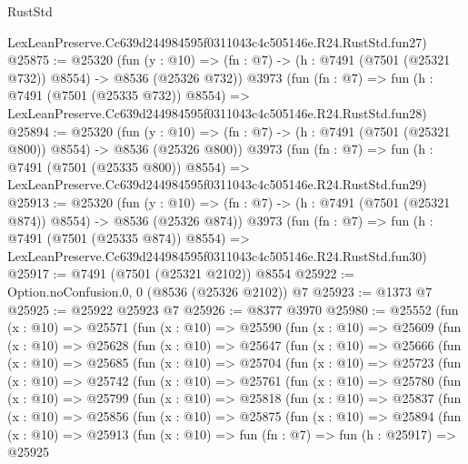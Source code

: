 \begin{lexlean}{RustStd}
\begin{coremodule}
    LexLeanPreserve.Cc639d244984595f0311043c4c505146e.R24.RustStd.fun27)
@25875 := @25320
    (fun (y : @10) => (fn : @7) -> (h : @7491 (@7501 (@25321 @732)) @8554) -> @8536 (@25326 @732))
    @3973
    (fun (fn : @7) =>
    fun (h : @7491 (@7501 (@25335 @732)) @8554) =>
    LexLeanPreserve.Cc639d244984595f0311043c4c505146e.R24.RustStd.fun28)
@25894 := @25320
    (fun (y : @10) => (fn : @7) -> (h : @7491 (@7501 (@25321 @800)) @8554) -> @8536 (@25326 @800))
    @3973
    (fun (fn : @7) =>
    fun (h : @7491 (@7501 (@25335 @800)) @8554) =>
    LexLeanPreserve.Cc639d244984595f0311043c4c505146e.R24.RustStd.fun29)
@25913 := @25320
    (fun (y : @10) => (fn : @7) -> (h : @7491 (@7501 (@25321 @874)) @8554) -> @8536 (@25326 @874))
    @3973
    (fun (fn : @7) =>
    fun (h : @7491 (@7501 (@25335 @874)) @8554) =>
    LexLeanPreserve.Cc639d244984595f0311043c4c505146e.R24.RustStd.fun30)
@25917 := @7491 (@7501 (@25321 @2102)) @8554
@25922 := Option.noConfusion.{0, 0} (@8536 (@25326 @2102)) @7
@25923 := @1373 @7
@25925 := @25922 @25923 @7
@25926 := @8377 @3970
@25980 := @25552
    (fun (x : @10) =>
    @25571
      (fun (x : @10) =>
      @25590
        (fun (x : @10) =>
        @25609
          (fun (x : @10) =>
          @25628
            (fun (x : @10) =>
            @25647
              (fun (x : @10) =>
              @25666
                (fun (x : @10) =>
                @25685
                  (fun (x : @10) =>
                  @25704
                    (fun (x : @10) =>
                    @25723
                      (fun (x : @10) =>
                      @25742
                        (fun (x : @10) =>
                        @25761
                          (fun (x : @10) =>
                          @25780
                            (fun (x : @10) =>
                            @25799
                              (fun (x : @10) =>
                              @25818
                                (fun (x : @10) =>
                                @25837
                                  (fun (x : @10) =>
                                  @25856
                                    (fun (x : @10) =>
                                    @25875
                                      (fun (x : @10) =>
                                      @25894
                                        (fun (x : @10) =>
                                        @25913
                                          (fun (x : @10) =>
                                          fun (fn : @7) =>
                                          fun (h : @25917) =>
                                          @25925

\end{coremodule}
\end{lexlean}
